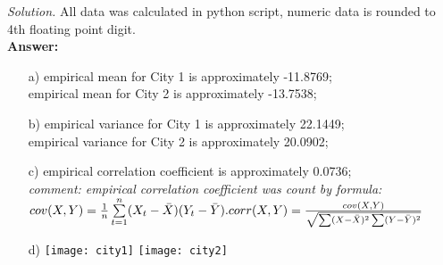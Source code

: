 \documentclass[12pt]{article}
\begin{document}
\begin{itemize}
\textit{Solution.} All data was calculated in python script, numeric data is rounded to 4th floating point digit. \\
\textbf{Answer:} \\
\begin{itemize}
\item[a)] empirical mean for City 1 is approximately -11.8769; \\
empirical mean for City 2 is approximately -13.7538;
\item[b)] empirical variance for City 1 is approximately 22.1449; \\
empirical variance for City 2 is approximately 20.0902;
\item[c)] empirical correlation coefficient is approximately 0.0736; \\
\textit{comment: empirical correlation coefficient was count by formula:}\\
$cov(X, Y) = \frac{1}{n}\sum\limits_{t=1}^{n}(X_t - \bar{X})(Y_t - \bar{Y}).\\
corr(X, Y) = \frac{cov(X, Y)}{\sqrt{\sum(X - \bar{X})^2\sum(Y - \bar{Y})^2}}$

\item[d)]
\texttt{[image: city1]}
\texttt{[image: city2]}
\end{itemize}

\end{itemize}
\end{document}
